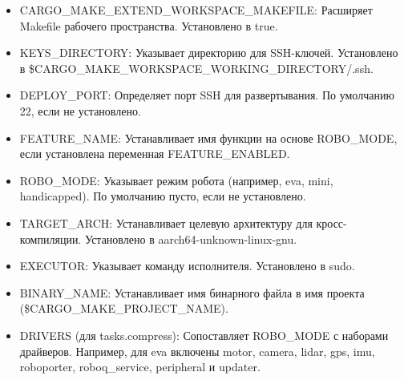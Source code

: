 \begin{itemize}
    \item CARGO\_MAKE\_EXTEND\_WORKSPACE\_MAKEFILE: Расширяет Makefile рабочего пространства. Установлено в true.
    \item KEYS\_DIRECTORY: Указывает директорию для SSH-ключей. Установлено в \${CARGO\_MAKE\_WORKSPACE\_WORKING\_DIRECTORY}/.ssh.
    \item DEPLOY\_PORT: Определяет порт SSH для развертывания. По умолчанию 22, если не установлено.
    \item FEATURE\_NAME: Устанавливает имя функции на основе ROBO\_MODE, если установлена переменная FEATURE\_ENABLED.
    \item ROBO\_MODE: Указывает режим робота (например, eva, mini, handicapped). По умолчанию пусто, если не установлено.
    \item TARGET\_ARCH: Устанавливает целевую архитектуру для кросс-компиляции. Установлено в aarch64-unknown-linux-gnu.
    \item EXECUTOR: Указывает команду исполнителя. Установлено в sudo.
    \item BINARY\_NAME: Устанавливает имя бинарного файла в имя проекта (\${CARGO\_MAKE\_PROJECT\_NAME}).
    \item DRIVERS (для tasks.compress): Сопоставляет ROBO\_MODE с наборами драйверов. Например, для eva включены motor, camera, lidar, gps, imu, roboporter, roboq\_service, peripheral и updater.
\end{itemize}

